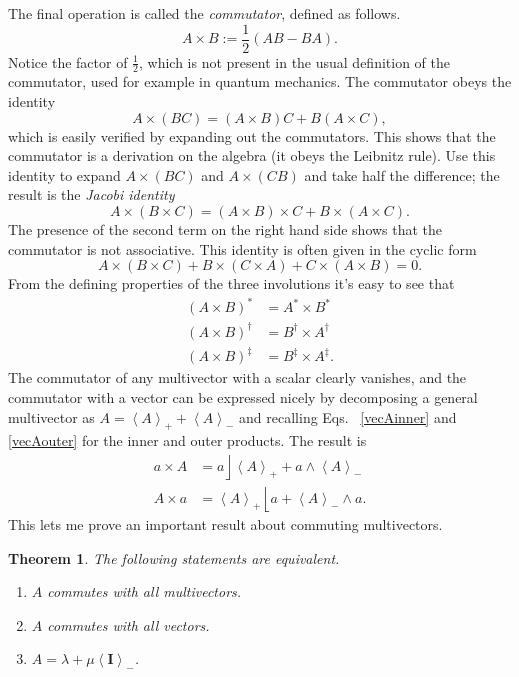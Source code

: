 \documentclass{utarticle}
\newcommand{\bl}[1]{\ensuremath{\bm{#1}}}
\newcommand{\I}{\bl{I}}
\DeclareMathOperator{\lin}{\rfloor}
\DeclareMathOperator{\rin}{\lfloor}
\DeclareMathOperator{\out}{\wedge}
\newcommand{\grinv}[2][]{\ensuremath{#2^{*#1}}}
\newcommand{\rev}[1]{\ensuremath{#1^\dagger}}
\newcommand{\clifconj}[1]{\ensuremath{#1^\ddagger}}
\newcommand{\commute}[2]{\ensuremath{#1 \times #2}}
\newcommand{\grade}[2][]{\ensuremath{\left\langle #2 \right\rangle_{#1}}}
\newcommand{\half}{\ensuremath{\frac{1}{2}}}
\newtheorem{thm}{Theorem}
\begin{document}
The final operation is called the \emph{commutator},
defined as follows.
\begin{equation} \commute{A}{B} := \half(AB - BA). \end{equation}
Notice the factor of $\half$, which is not present in the usual
definition of the commutator, used for example in quantum mechanics.
The commutator obeys the identity
\begin{equation}
\commute{A}{(BC)} = (\commute{A}{B})C + B(\commute{A}{C}),
\label{commident}
\end{equation}
which is easily verified by expanding out the commutators.  This shows that 
the commutator is a derivation on the algebra (it obeys the Leibnitz rule).  
Use this identity to expand $\commute{A}{(BC)}$ and $\commute{A}{(CB)}$ 
and take half the difference; the result is the \emph{Jacobi identity}
\begin{equation}
\commute{A}{(\commute{B}{C})} = \commute{(\commute{A}{B})}{C} + \commute{B}{(\commute{A}{C})}.
\end{equation}
The presence of the second term on the right hand side shows that the 
commutator is not associative.  This identity is often given in the cyclic form
\begin{equation}
\commute{A}{(\commute{B}{C})} + \commute{B}{(\commute{C}{A})} + \commute{C}{(\commute{A}{B})} = 0.
\end{equation}
From the defining properties of the three involutions it's easy to see that
\begin{align}
\grinv{(\commute{A}{B})} & = \commute{\grinv{A}}{\grinv{B}} \nonumber \\
\rev{(\commute{A}{B})} & = \commute{\rev{B}}{\rev{A}} \nonumber \\
\clifconj{(\commute{A}{B})} & = \commute{\clifconj{B}}{\clifconj{A}}.
\end{align} 
The commutator of any multivector with a scalar clearly vanishes, and the 
commutator with a vector can be expressed nicely by decomposing a general
multivector as $A = \grade[+]{A} + \grade[-]{A}$ and recalling Eqs.~
\eqref{vecAinner} and \eqref{vecAouter} for the inner and outer products.  
The result is
\begin{align}
\commute{a}{A} & = a \lin \grade[+]{A} + a \out \grade[-]{A} \nonumber \\
\commute{A}{a} & = \grade[+]{A} \rin a + \grade[-]{A} \out a.
\label{commutewithvec}
\end{align}
This lets me prove an important result about commuting multivectors.
\begin{thm}
The following statements are equivalent.
\begin{enumerate}
\item $A$ commutes with all multivectors.
\item $A$ commutes with all vectors.
\item $A = \lambda + \mu \grade[-]{\I}$.
\end{enumerate}
\label{commutewithvecs}
\end{thm}
\end{document}
